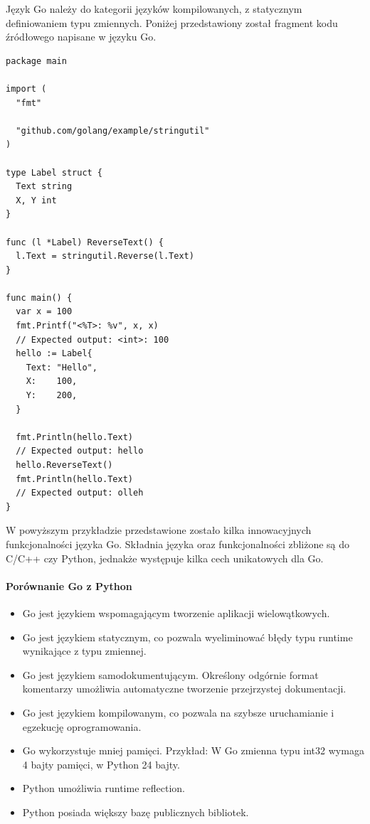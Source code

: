 \documentclass[a4paper,12pt,twoside,openany]{report}
\begin{document}
Język Go należy do kategorii języków kompilowanych, z statycznym definiowaniem typu zmiennych. 
Poniżej przedstawiony został fragment kodu źródłowego napisane w języku Go.

\begin{lstlisting}
package main

import (
  "fmt"

  "github.com/golang/example/stringutil"
)

type Label struct {
  Text string
  X, Y int
}

func (l *Label) ReverseText() {
  l.Text = stringutil.Reverse(l.Text)
}

func main() {
  var x = 100
  fmt.Printf("<%T>: %v", x, x)
  // Expected output: <int>: 100
  hello := Label{
    Text: "Hello",
    X:    100,
    Y:    200,
  }
  
  fmt.Println(hello.Text)
  // Expected output: hello
  hello.ReverseText()
  fmt.Println(hello.Text)
  // Expected output: olleh
}

\end{lstlisting}

W powyższym przykładzie przedstawione zostało kilka innowacyjnych funkcjonalności języka Go.
Składnia języka oraz funkcjonalności zbliżone są do C/C++ czy Python, jednakże występuje kilka cech unikatowych dla Go.

\paragraph{Porównanie Go z Python}
\begin{itemize}
 \item Go jest językiem wspomagającym tworzenie aplikacji wielowątkowych.
 \item Go jest językiem statycznym, co pozwala wyeliminować błędy typu runtime wynikające z typu zmiennej.
 \item Go jest językiem samodokumentującym. Określony odgórnie format komentarzy umożliwia automatyczne tworzenie przejrzystej dokumentacji.
 \item Go jest językiem kompilowanym, co pozwala na szybsze uruchamianie i egzekucję oprogramowania.
 \item Go wykorzystuje mniej pamięci. Przykład: W Go zmienna typu int32 wymaga 4 bajty pamięci, w Python 24 bajty.
 \item Python umożliwia runtime reflection.
 \item Python posiada większy bazę publicznych bibliotek.
\end{itemize}
\end{document}
